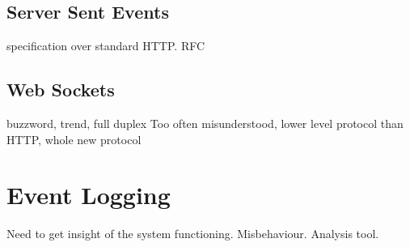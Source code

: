 \subsection{Server Sent Events}
specification over standard HTTP. RFC

\subsection{Web Sockets}
buzzword, trend, full duplex
Too often misunderstood, lower level protocol than HTTP, whole new protocol

\section{Event Logging}
Need to get insight of the system functioning. Misbehaviour. Analysis tool.
